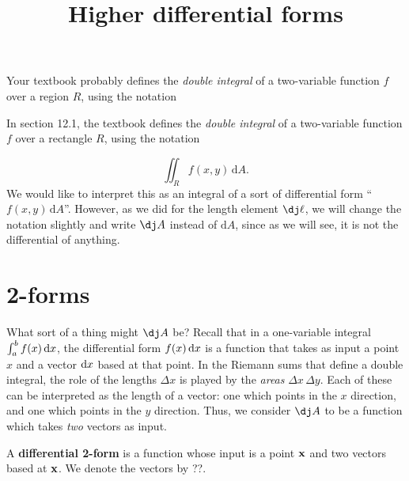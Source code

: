 \documentclass[12pt]{amsart}
\title{Higher differential forms}
\begin{document}
\maketitle

\begin{notextbook}Your textbook probably defines the \emph{double integral} of a two-variable function $f$ over a region $R$, using the notation\end{notextbook}
\begin{stewart}In section 12.1, the textbook defines the \emph{double integral} of a two-variable function $f$ over a rectangle $R$, using the notation\end{stewart}
\[ \iint_R f(x,y) \,\mathrm{d}A. \]
We would like to interpret this as an integral of a sort of differential form ``$f(x,y) \,\mathrm{d}A$''.
However, as we did for the length element $\dl$, we will change the notation slightly and write $\dA$ instead of $\mathrm{d}A$, since as we will see, it is not the differential of anything.

\section{2-forms}
\label{sec:2-forms}

What sort of a thing might $\dA$ be?
Recall that in a one-variable integral $\int_a^b f(x)\,{\mathrm{d} x}$, the differential form $f(x)\,{\mathrm{d} x}$ is a function that takes as input a point $x$ and a vector ${\mathrm{d} x}$ based at that point.
In the Riemann sums that define a double integral, the role of the lengths $\Delta x$ is played by the \emph{areas} $\Delta x \,\Delta y$.
Each of these can be interpreted as the length of a vector: one which points in the $x$ direction, and one which points in the $y$ direction.
Thus, we consider $\dA$ to be a function which takes \emph{two} vectors as input.

\begin{defn}
  A \textbf{differential 2-form} is a function whose input is a point $\mathbf{x}$ and two vectors based at $\mathbf{x}$.
  We denote the vectors by ??.
\end{defn}
\end{document}
